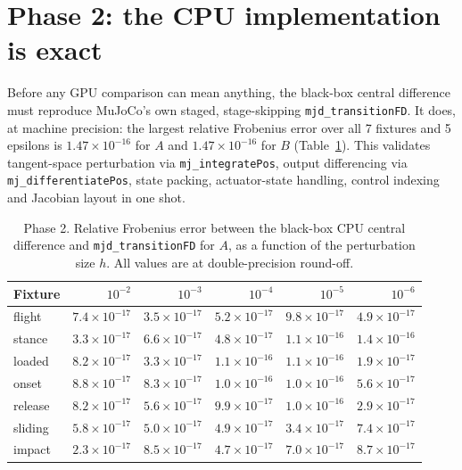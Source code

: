 \documentclass[11pt,a4paper]{article}
\newcommand{\code}[1]{\texttt{\small #1}}
\begin{document}
\section{Phase 2: the CPU implementation is exact}

Before any GPU comparison can mean anything, the black-box central difference must
reproduce MuJoCo's own staged, stage-skipping \code{mjd\_transitionFD}. It does, at machine
precision: the largest relative Frobenius error over all 7 fixtures and 5 epsilons is
$1.47\times10^{-16}$ for $A$ and $1.47\times10^{-16}$ for $B$
(Table~\ref{tab:phase2}). This validates tangent-space perturbation via
\code{mj\_integratePos}, output differencing via \code{mj\_differentiatePos}, state
packing, actuator-state handling, control indexing and Jacobian layout in one shot.

\begin{table}[htbp]
\centering
\footnotesize
\caption{Phase 2. Relative Frobenius error between the black-box CPU central difference and \code{mjd\_transitionFD} for $A$, as a function of the perturbation size $h$. All values are at double-precision round-off.}
\label{tab:phase2}
\begin{tabular}{lrrrrr}
\toprule
\textbf{Fixture} & $10^{-2}$ & $10^{-3}$ & $10^{-4}$ & $10^{-5}$ & $10^{-6}$ \\
\midrule
flight & $7.4\times10^{-17}$ & $3.5\times10^{-17}$ & $5.2\times10^{-17}$ & $9.8\times10^{-17}$ & $4.9\times10^{-17}$ \\
stance & $3.3\times10^{-17}$ & $6.6\times10^{-17}$ & $4.8\times10^{-17}$ & $1.1\times10^{-16}$ & $1.4\times10^{-16}$ \\
loaded & $8.2\times10^{-17}$ & $3.3\times10^{-17}$ & $1.1\times10^{-16}$ & $1.1\times10^{-16}$ & $1.9\times10^{-17}$ \\
onset & $8.8\times10^{-17}$ & $8.3\times10^{-17}$ & $1.0\times10^{-16}$ & $1.0\times10^{-16}$ & $5.6\times10^{-17}$ \\
release & $8.2\times10^{-17}$ & $5.6\times10^{-17}$ & $9.9\times10^{-17}$ & $1.0\times10^{-16}$ & $2.9\times10^{-17}$ \\
sliding & $5.8\times10^{-17}$ & $5.0\times10^{-17}$ & $4.9\times10^{-17}$ & $3.4\times10^{-17}$ & $7.4\times10^{-17}$ \\
impact & $2.3\times10^{-17}$ & $8.5\times10^{-17}$ & $4.7\times10^{-17}$ & $7.0\times10^{-17}$ & $8.7\times10^{-17}$ \\
\bottomrule
\end{tabular}
\end{table}
\end{document}
